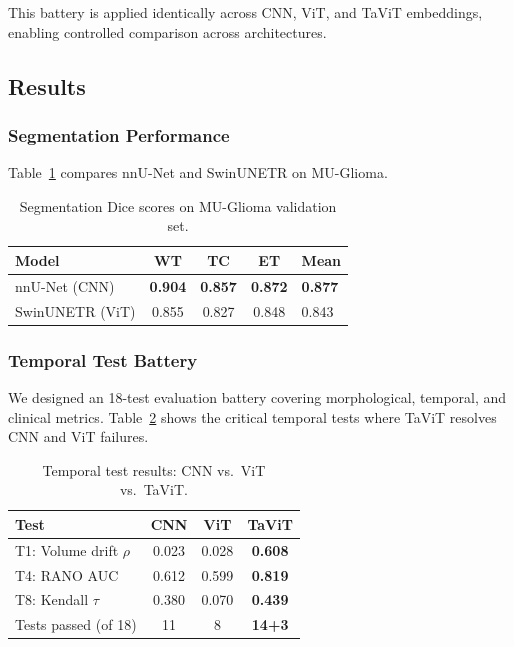 \documentclass[conference]{IEEEtran}
\begin{document}
This battery is applied identically across CNN, ViT, and TaViT embeddings, enabling controlled comparison across architectures.




\subsection{Results}
\label{sec:results}

\subsubsection{Segmentation Performance}
Table~\ref{tab:segmentation} compares nnU-Net and SwinUNETR on MU-Glioma.

\begin{table}[h]
\centering
\caption{Segmentation Dice scores on MU-Glioma validation set.}
\label{tab:segmentation}
\begin{tabular}{lcccl}
\toprule
\textbf{Model} & \textbf{WT} & \textbf{TC} & \textbf{ET} & \textbf{Mean} \\
\midrule
nnU-Net (CNN)     & \textbf{0.904} & \textbf{0.857} & \textbf{0.872} & \textbf{0.877} \\
SwinUNETR (ViT)   & 0.855 & 0.827 & 0.848 & 0.843 \\
\bottomrule
\end{tabular}
\end{table}


\subsubsection{Temporal Test Battery}
We designed an 18-test evaluation battery covering morphological, temporal, and clinical metrics. Table~\ref{tab:temporal} shows the critical temporal tests where TaViT resolves CNN and ViT failures.

\begin{table}[h]
\centering
\caption{Temporal test results: CNN vs.\ ViT vs.\ TaViT.}
\label{tab:temporal}
\begin{tabular}{lccc}
\toprule
\textbf{Test} & \textbf{CNN} & \textbf{ViT} & \textbf{TaViT} \\
\midrule
T1: Volume drift $\rho$     & 0.023 & 0.028 & \textbf{0.608} \\
T4: RANO AUC                & 0.612 & 0.599 & \textbf{0.819} \\
T8: Kendall $\tau$           & 0.380 & 0.070 & \textbf{0.439} \\
\midrule
Tests passed (of 18)         & 11    & 8     & \textbf{14+3} \\
\bottomrule
\end{tabular}
\end{table}
\end{document}
